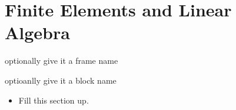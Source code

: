 \section{Finite Elements and Linear Algebra}
\begin{frame}{optionally give it a frame name}
	\begin{block}{optioanlly give it a block name}
		\begin{itemize}
			\item Fill this section up.
		\end{itemize}
	\end{block}
\end{frame}
